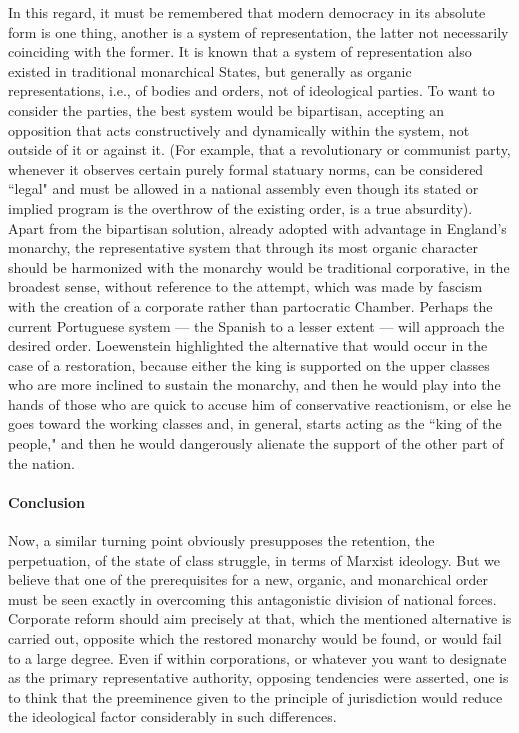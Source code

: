In this regard, it must be remembered that modern democracy in its absolute form is one thing, another is a system of representation, the latter not necessarily coinciding with the former. It is known that a system of representation also existed in traditional monarchical States, but generally as organic representations, i.e., of bodies and orders, not of ideological parties. To want to consider the parties, the best system would be bipartisan, accepting an opposition that acts constructively and dynamically within the system, not outside of it or against it. (For example, that a revolutionary or communist party, whenever it observes certain purely formal statuary norms, can be considered ``legal" and must be allowed in a national assembly even though its stated or implied program is the overthrow of the existing order, is a true absurdity). Apart from the bipartisan solution, already adopted with advantage in England's monarchy, the representative system that through its most organic character should be harmonized with the monarchy would be traditional corporative, in the broadest sense, without reference to the attempt, which was made by fascism with the creation of a corporate rather than partocratic Chamber. Perhaps the current Portuguese system — the Spanish to a lesser extent — will approach the desired order. Loewenstein highlighted the alternative that would occur in the case of a restoration, because either the king is supported on the upper classes who are more inclined to sustain the monarchy, and then he would play into the hands of those who are quick to accuse him of conservative reactionism, or else he goes toward the working classes and, in general, starts acting as the ``king of the people," and then he would dangerously alienate the support of the other part of the nation.


\paragraph{Conclusion} Now, a similar turning point obviously presupposes the retention, the perpetuation, of the state of class struggle, in terms of Marxist ideology. But we believe that one of the prerequisites for a new, organic, and monarchical order must be seen exactly in overcoming this antagonistic division of national forces. Corporate reform should aim precisely at that, which the mentioned alternative is carried out, opposite which the restored monarchy would be found, or would fail to a large degree. Even if within corporations, or whatever you want to designate as the primary representative authority, opposing tendencies were asserted, one is to think that the preeminence given to the principle of jurisdiction would reduce the ideological factor considerably in such differences.

